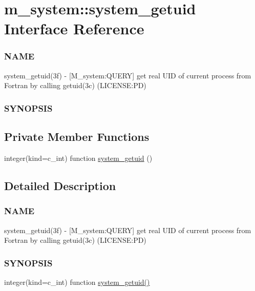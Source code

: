 \hypertarget{interfacem__system_1_1system__getuid}{}\section{m\+\_\+system\+:\+:system\+\_\+getuid Interface Reference}
\label{interfacem__system_1_1system__getuid}


\subsubsection*{N\+A\+ME}

system\+\_\+getuid(3f) -\/ \mbox{[}M\+\_\+system\+:Q\+U\+E\+RY\mbox{]} get real U\+ID of current process from Fortran by calling getuid(3c) (L\+I\+C\+E\+N\+SE\+:PD) \subsubsection*{S\+Y\+N\+O\+P\+S\+IS} 


\subsection*{Private Member Functions}
\begin{DoxyCompactItemize}
\item 
integer(kind=c\+\_\+int) function \mbox{\hyperlink{interfacem__system_1_1system__getuid_adb2147a5c9768d09bd7741b07f02af05}{system\+\_\+getuid}} ()
\end{DoxyCompactItemize}


\subsection{Detailed Description}
\subsubsection*{N\+A\+ME}

system\+\_\+getuid(3f) -\/ \mbox{[}M\+\_\+system\+:Q\+U\+E\+RY\mbox{]} get real U\+ID of current process from Fortran by calling getuid(3c) (L\+I\+C\+E\+N\+SE\+:PD) \subsubsection*{S\+Y\+N\+O\+P\+S\+IS}

integer(kind=c\+\_\+int) function \mbox{\hyperlink{interfacem__system_1_1system__getuid_adb2147a5c9768d09bd7741b07f02af05}{system\+\_\+getuid()}}

